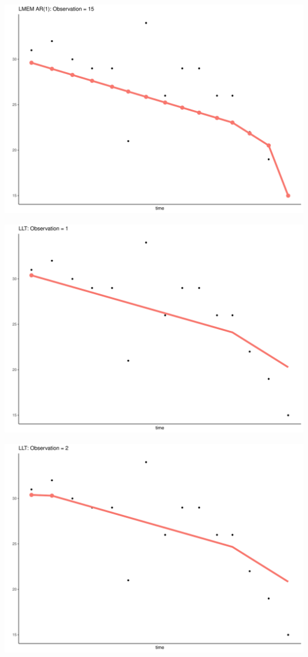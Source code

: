 \documentclass[
  ignorenonframetext,
]{beamer}
\begin{document}
\begin{frame}{}
\protect\hypertarget{section-29}{}
\includegraphics{Prez4_files/figure-beamer/unnamed-chunk-14-15.pdf}
\end{frame}

\begin{frame}{}
\protect\hypertarget{section-30}{}
\includegraphics{Prez4_files/figure-beamer/unnamed-chunk-15-1.pdf}
\end{frame}

\begin{frame}{}
\protect\hypertarget{section-31}{}
\includegraphics{Prez4_files/figure-beamer/unnamed-chunk-15-2.pdf}
\end{frame}
\end{document}
